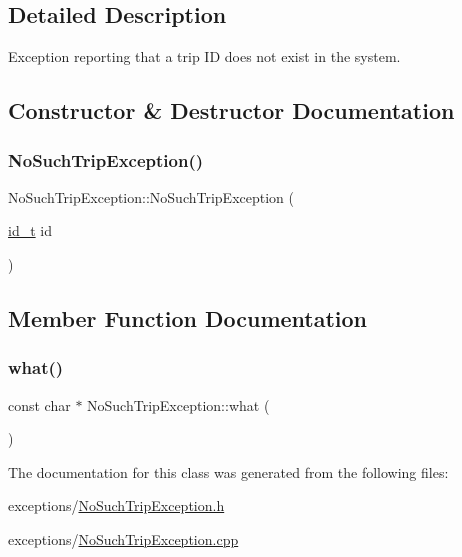 \subsection{Detailed Description}
Exception reporting that a trip ID does not exist in the system. 

\subsection{Constructor \& Destructor Documentation}
\mbox{\label{classNoSuchTripException_ad4e2e75706508833ccbb7a793092734c}} 
\subsubsection{\texorpdfstring{No\+Such\+Trip\+Exception()}{NoSuchTripException()}}
{\footnotesize\ttfamily No\+Such\+Trip\+Exception\+::\+No\+Such\+Trip\+Exception (\begin{DoxyParamCaption}\item[{\mbox{\hyperlink{project__utils_8h_a8f3a969054ad2200720b96e7e23dd4e1}{id\+\_\+t}}}]{id }\end{DoxyParamCaption})}



\subsection{Member Function Documentation}
\mbox{\label{classNoSuchTripException_a48adffc40883e044fd248f1185084bb6}} 
\subsubsection{\texorpdfstring{what()}{what()}}
{\footnotesize\ttfamily const char $\ast$ No\+Such\+Trip\+Exception\+::what (\begin{DoxyParamCaption}{ }\end{DoxyParamCaption})}



The documentation for this class was generated from the following files\+:\begin{DoxyCompactItemize}
\item 
exceptions/\mbox{\hyperlink{NoSuchTripException_8h}{No\+Such\+Trip\+Exception.\+h}}\item 
exceptions/\mbox{\hyperlink{NoSuchTripException_8cpp}{No\+Such\+Trip\+Exception.\+cpp}}\end{DoxyCompactItemize}
